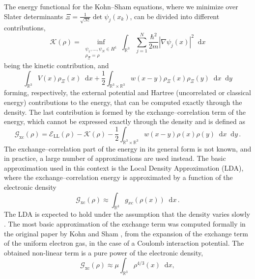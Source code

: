 \documentclass[12pt,a4paper]{amsart}
\numberwithin{equation}{section}
\newcommand*\diff{\mathop{}\!\mathrm{d}}
\begin{document}
	The energy functional for the Kohn–Sham equations, where we minimize over Slater determinants $ \Xi = \frac{1}{\sqrt{N!}} \det \psi_j(x_k)$, can be divided into different contributions,
	\begin{equation}
		\mathscr{K}(\rho) = \inf_{\substack{\psi_1, \dots, \psi_N \in H^1 \\ \rho_\Xi = \rho }} \int_{\mathbb{R}^3} \sum_{j=1}^N \frac{\hbar^2}{2m} | \nabla \psi_j (x) |^2 \diff  x
	\end{equation}
	being the kinetic contribution, and
	\begin{equation}
		\int_{\mathbb{R}^3} V(x) \rho_\Xi(x) \diff  x + \frac{1}{2} \int_{\mathbb{R}^3 \times \mathbb{R}^3 } w(x-y) \rho_\Xi(x) \rho_\Xi(y) \diff  x\diff  y
	\end{equation}
	forming, respectively, the external potential and Hartree (uncorrelated or classical energy) contributions to the energy, that can be computed exactly through the density. The last contribution is formed by the exchange–correlation term of the energy, which cannot be expressed exactly through the density and is defined as
	\begin{equation}
		\mathscr{G}_{\mathrm{xc}}(\rho) = \mathscr{E}_{\mathrm{LL}}(\rho) - \mathscr{K}(\rho) - \frac{1}{2} \int_{\mathbb{R}^3 \times \mathbb{R}^3 } w(x-y) \rho(x) \rho(y) \diff  x\diff  y\, .
	\end{equation}
	The exchange–correlation part of the energy in its general form is not known, and in practice, a large number of approximations are used instead. The basic approximation used in this context is the Local Density Approximation (LDA), where the exchange–correlation energy is approximated by a function of the electronic density
	\begin{equation}
		\mathscr{G}_{\mathrm{xc}}(\rho) \approx \int_{\mathbb{R}^3} g_{xc}(\rho(x)) \diff  x\, .
	\end{equation}
	The LDA is expected to hold under the assumption that the density varies slowly \cite{engel2011density}.
	The most basic approximation of the exchange term was computed formally in the original paper by Kohn and Sham \cite{kohnsham1965}, from the expansion of the exchange term of the uniform electron gas, in the case of a Coulomb interaction potential. The obtained non-linear term is a pure power of the electronic density,
	\begin{equation}\label{eq:exchange_power}
		\mathscr{G}_{\mathrm{xc}}(\rho) \approx \mu \int_{\mathbb{R}^3} \rho^{4/3}(x) \diff  x,
	\end{equation}
\end{document}
